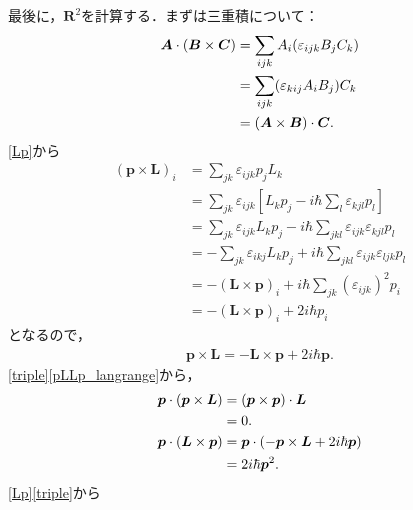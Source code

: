 最後に，$\boldsymbol{R}^2$を計算する．まずは三重積について：
\begin{align}
  \boldsymbol{A}\cdot(\boldsymbol{B}\times\boldsymbol{C})
  & = \sum_{ijk}A_i(\varepsilon_{ijk}B_jC_k)\notag\\
  & = \sum_{ijk}(\varepsilon_{kij}A_iB_j)C_k\notag\\
  & = (\boldsymbol{A}\times\boldsymbol{B})\cdot\boldsymbol{C}.\label{triple}
\end{align}
\eqref{Lp}から
\begin{align*}
  (\boldsymbol{p}\times\boldsymbol{L})_i & = \sum_{jk}\varepsilon_{ijk}p_jL_k\\
  & = \sum_{jk}\varepsilon_{ijk}\left[L_kp_j - i\hbar\sum_l\varepsilon_{kjl}p_l\right]\\
  & = \sum_{jk}\varepsilon_{ijk}L_kp_j - i\hbar\sum_{jkl}\varepsilon_{ijk}\varepsilon_{kjl}p_l\\
  & = - \sum_{jk}\varepsilon_{ikj}L_kp_j + i\hbar\sum_{jkl}\varepsilon_{ijk}\varepsilon_{ljk}p_l\\
  & = - (\boldsymbol{L}\times\boldsymbol{p})_i + i\hbar\sum_{jk}(\varepsilon_{ijk})^2p_i\\
  & = - (\boldsymbol{L}\times\boldsymbol{p})_i + 2i\hbar p_i
\end{align*}
となるので，
\begin{align}
  \boldsymbol{p}\times\boldsymbol{L}= - \boldsymbol{L}\times\boldsymbol{p} + 2i\hbar\boldsymbol{p}.\label{pLLp_langrange}
\end{align}
\eqref{triple}\eqref{pLLp_langrange}から，
\begin{align}
  \boldsymbol{p}\cdot(\boldsymbol{p}\times\boldsymbol{L})
  & = (\boldsymbol{p}\times\boldsymbol{p})\cdot\boldsymbol{L}\notag\\
  & = 0.\label{ppL}\\
  \boldsymbol{p}\cdot(\boldsymbol{L}\times\boldsymbol{p})
  & = \boldsymbol{p}\cdot( - \boldsymbol{p}\times\boldsymbol{L} + 2i\hbar\boldsymbol{p})\notag\\
  & = 2i\hbar\boldsymbol{p}^2.\label{pLp}
\end{align}
\eqref{Lp}\eqref{triple}から
